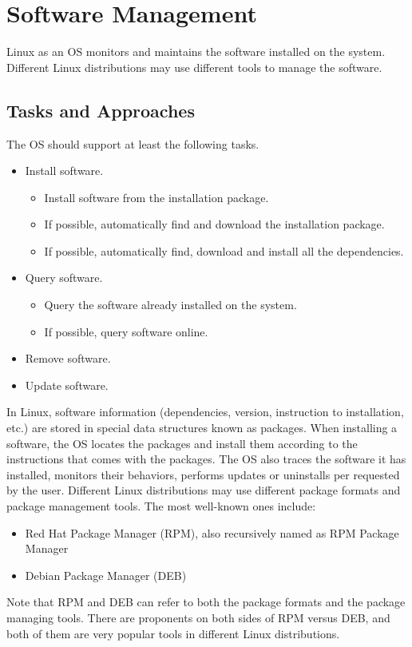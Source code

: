 \chapter{Software Management}

Linux as an OS monitors and maintains the software installed on the system. Different Linux distributions may use different tools to manage the software.

\section{Tasks and Approaches}

The OS should support at least the following tasks.
\begin{itemize}
	\item Install software.
		\begin{itemize}
			\item Install software from the installation package.
			\item If possible, automatically find and download the installation package.
			\item If possible, automatically find, download and install all the dependencies.
		\end{itemize}
	\item Query software.
		\begin{itemize}
			\item Query the software already installed on the system.
			\item If possible, query software online.
		\end{itemize}
	\item Remove software.
	\item Update software.
\end{itemize}

In Linux, software information (dependencies, version, instruction to installation, etc.) are stored in special data structures known as packages. When installing a software, the OS locates the packages and install them according to the instructions that comes with the packages. The OS also traces the software it has installed, monitors their behaviors, performs updates or uninstalls per requested by the user. Different Linux distributions may use different package formats and package management tools. The most well-known ones include:
\begin{itemize}
	\item Red Hat Package Manager (RPM), also recursively named as RPM Package Manager
	\item Debian Package Manager (DEB)
\end{itemize}
Note that RPM and DEB can refer to both the package formats and the package managing tools. There are proponents on both sides of RPM versus DEB, and both of them are very popular tools in different Linux distributions.

